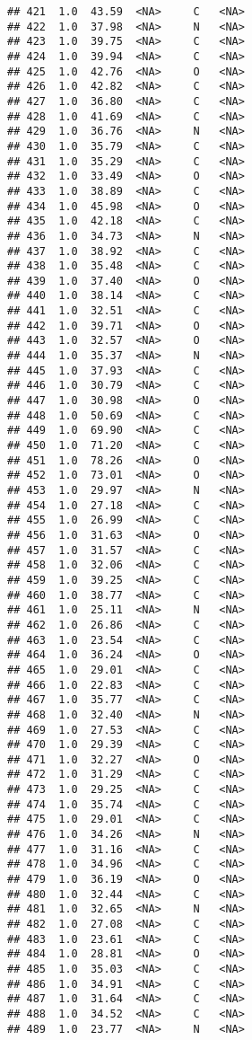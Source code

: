 \documentclass[
]{article}
\begin{document}
\begin{verbatim}
## 421  1.0  43.59  <NA>     C   <NA>
## 422  1.0  37.98  <NA>     N   <NA>
## 423  1.0  39.75  <NA>     C   <NA>
## 424  1.0  39.94  <NA>     C   <NA>
## 425  1.0  42.76  <NA>     O   <NA>
## 426  1.0  42.82  <NA>     C   <NA>
## 427  1.0  36.80  <NA>     C   <NA>
## 428  1.0  41.69  <NA>     C   <NA>
## 429  1.0  36.76  <NA>     N   <NA>
## 430  1.0  35.79  <NA>     C   <NA>
## 431  1.0  35.29  <NA>     C   <NA>
## 432  1.0  33.49  <NA>     O   <NA>
## 433  1.0  38.89  <NA>     C   <NA>
## 434  1.0  45.98  <NA>     O   <NA>
## 435  1.0  42.18  <NA>     C   <NA>
## 436  1.0  34.73  <NA>     N   <NA>
## 437  1.0  38.92  <NA>     C   <NA>
## 438  1.0  35.48  <NA>     C   <NA>
## 439  1.0  37.40  <NA>     O   <NA>
## 440  1.0  38.14  <NA>     C   <NA>
## 441  1.0  32.51  <NA>     C   <NA>
## 442  1.0  39.71  <NA>     O   <NA>
## 443  1.0  32.57  <NA>     O   <NA>
## 444  1.0  35.37  <NA>     N   <NA>
## 445  1.0  37.93  <NA>     C   <NA>
## 446  1.0  30.79  <NA>     C   <NA>
## 447  1.0  30.98  <NA>     O   <NA>
## 448  1.0  50.69  <NA>     C   <NA>
## 449  1.0  69.90  <NA>     C   <NA>
## 450  1.0  71.20  <NA>     C   <NA>
## 451  1.0  78.26  <NA>     O   <NA>
## 452  1.0  73.01  <NA>     O   <NA>
## 453  1.0  29.97  <NA>     N   <NA>
## 454  1.0  27.18  <NA>     C   <NA>
## 455  1.0  26.99  <NA>     C   <NA>
## 456  1.0  31.63  <NA>     O   <NA>
## 457  1.0  31.57  <NA>     C   <NA>
## 458  1.0  32.06  <NA>     C   <NA>
## 459  1.0  39.25  <NA>     C   <NA>
## 460  1.0  38.77  <NA>     C   <NA>
## 461  1.0  25.11  <NA>     N   <NA>
## 462  1.0  26.86  <NA>     C   <NA>
## 463  1.0  23.54  <NA>     C   <NA>
## 464  1.0  36.24  <NA>     O   <NA>
## 465  1.0  29.01  <NA>     C   <NA>
## 466  1.0  22.83  <NA>     C   <NA>
## 467  1.0  35.77  <NA>     C   <NA>
## 468  1.0  32.40  <NA>     N   <NA>
## 469  1.0  27.53  <NA>     C   <NA>
## 470  1.0  29.39  <NA>     C   <NA>
## 471  1.0  32.27  <NA>     O   <NA>
## 472  1.0  31.29  <NA>     C   <NA>
## 473  1.0  29.25  <NA>     C   <NA>
## 474  1.0  35.74  <NA>     C   <NA>
## 475  1.0  29.01  <NA>     C   <NA>
## 476  1.0  34.26  <NA>     N   <NA>
## 477  1.0  31.16  <NA>     C   <NA>
## 478  1.0  34.96  <NA>     C   <NA>
## 479  1.0  36.19  <NA>     O   <NA>
## 480  1.0  32.44  <NA>     C   <NA>
## 481  1.0  32.65  <NA>     N   <NA>
## 482  1.0  27.08  <NA>     C   <NA>
## 483  1.0  23.61  <NA>     C   <NA>
## 484  1.0  28.81  <NA>     O   <NA>
## 485  1.0  35.03  <NA>     C   <NA>
## 486  1.0  34.91  <NA>     C   <NA>
## 487  1.0  31.64  <NA>     C   <NA>
## 488  1.0  34.52  <NA>     C   <NA>
## 489  1.0  23.77  <NA>     N   <NA>

\end{verbatim}
\end{document}

